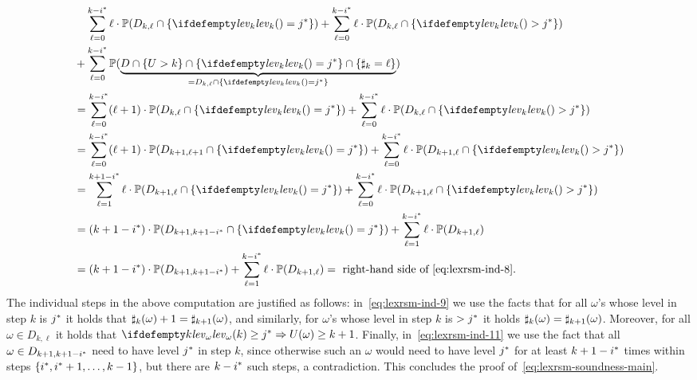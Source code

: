 \begin{align}
&\phantom{+}\;\sum_{\ell=0}^{k-\fixn{i}} \ell\cdot\probm(D_{k,\ell} \cap \{\levelrank{}{k}=\fixn{j}\}) + \sum_{\ell=0}^{k-\fixn{i}} \ell\cdot\probm(D_{k,\ell}\cap \{\levelrank{}{k}>\fixn{j}\} )\nonumber \\ 
&+\sum_{\ell=0}^{k-\fixn{i}}\probm(\underbrace{D \cap \{U>k\} \cap \{\levelrank{}{k} = \fixn{j}\} \cap \{\noofdec_k = \ell\}}_{=D_{k,\ell} \cap \{\levelrank{}{k} = \fixn{j}\}})
\nonumber \\
&= \sum_{\ell=0}^{k-\fixn{i}}(\ell+1) \cdot\probm(D_{k,\ell}\cap \{\levelrank{}{k} = \fixn{j}\}) +  \sum_{\ell=0}^{k-\fixn{i}} \ell\cdot\probm(D_{k,\ell}\cap \{\levelrank{}{k}>\fixn{j}\} ) \nonumber\\
&=\sum_{\ell=0}^{k-\fixn{i}} (\ell+1)\cdot \probm{(D_{k+1,\ell+1} \cap \{\levelrank{}{k} = \fixn{j}\})} +  \sum_{\ell=0}^{k-\fixn{i}} \ell\cdot\probm(D_{k+1,\ell}\cap \{\levelrank{}{k}>\fixn{j}\} ) \label{eq:lexrsm-ind-9}\\
&= \sum_{\ell=1}^{k+1-\fixn{i}} \ell\cdot \probm{(D_{k+1,\ell} \cap \{\levelrank{}{k} = \fixn{j}\})} +  \sum_{\ell=0}^{k-\fixn{i}} \ell\cdot\probm(D_{k+1,\ell}\cap \{\levelrank{}{k}>\fixn{j}\} )
\nonumber \\
&= (k+1-\fixn{i})\cdot \probm{(D_{k+1,k+1-\fixn{i}}\cap\{\levelrank{}{k} =\fixn{j} \} )} + \sum_{\ell=1}^{k-\fixn{i}} \ell \cdot \probm(D_{k+1,\ell})  \nonumber\\
&= (k+1-\fixn{i})\cdot\probm(D_{k+1,k+1-\fixn{i}}) + \sum_{\ell=1}^{k-\fixn{i}}\ell\cdot\probm(D_{k+1,\ell}) = \text{ right-hand side of~\eqref{eq:lexrsm-ind-8}} \label{eq:lexrsm-ind-11}.
\end{align}
The individual steps in the above computation are justified as follows: in~\eqref{eq:lexrsm-ind-9} we use the facts that for all $\omega$'s whose level in step $k$ is ${j}^*$ it holds that $\sharp_k(\omega)+1=\sharp_{k+1}(\omega)$, and similarly, for $\omega$'s whose level in step $k$ is $>{j}^*$ it holds $\sharp_k(\omega)=\sharp_{k+1}(\omega)$. Moreover, for all $\omega\in D_{k,\ell}$ it holds that $\levelrank{k}{\omega}\geq \fixn{j} \Rightarrow U(\omega)\geq k+1$. Finally, in~\eqref{eq:lexrsm-ind-11} we use the fact that all $\omega\in D_{k+1,k+1-{i}^*}$ need to have level ${j}^*$ in step $k$, since otherwise such an $\omega$ would need to have level ${j}^*$ for at least $k+1-{i}^*$ times within steps $\{{i}^*,{i}^*+1,\dots,k-1\}$, but there are $k-{i}^*$ such steps, a contradiction. This concludes the proof of~\eqref{eq:lexrsm-soundness-main}.




